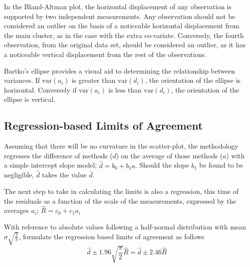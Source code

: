\documentclass[Main.tex]{subfiles}
\begin{document}
	In the Bland-Altman plot, the horizontal displacement of any observation is supported by two independent measurements. Any
	observation should not be considered an outlier on the basis of a
	noticeable horizontal displacement from the main cluster, as in
	the case with the extra co-variate. Conversely, the fourth observation, from the original data set, should be considered an
	outlier, as it has a noticeable vertical displacement from the rest of the observations.
	
	Bartko's ellipse provides a visual aid to determining the relationship between variances. If $\mbox{var}(a_{i})$ is greater
	than $\mbox{var}(d_{i})$, the orientation of the ellipse is	horizontal. Conversely if $\mbox{var}(a_{i})$ is less than
	$\mbox{var}(d_{i})$, the orientation of the ellipse is vertical.
	\newpage
	
	
	
	

	\subsection{Regression-based Limits of Agreement} Assuming that
	there will be no curvature in the scatter-plot, the methodology
	regresses the difference of methods ($d$) on the average of those
	methods ($a$) with a simple intercept slope model; $\hat{d} =
	b_{0}+ b_{1}a.$ Should the slope $b_{1}$ be found to be
	negligible, $\hat{d}$ takes the value $\bar{d}$.
	
	The next step to take in calculating the limits is also a
	regression, this time of the residuals as a function of the scale
	of the measurements, expressed by the averages $a_{i}$;
	$ \hat{R} = c_{0}+ c_{1}a_{i}$
	
	With reference to absolute values following a half-normal
	distribution with mean $\sigma\sqrt{\frac{2}{\pi}}$, \citet{BA99} formulate the regression based limits of agreement as
	follows
	\begin{equation}
	\hat{d} \pm 1.96\sqrt{\frac{\pi}{2}}\hat{R} = \hat{d} \pm 2.46\hat{R}
	\end{equation}
	
\end{document}
